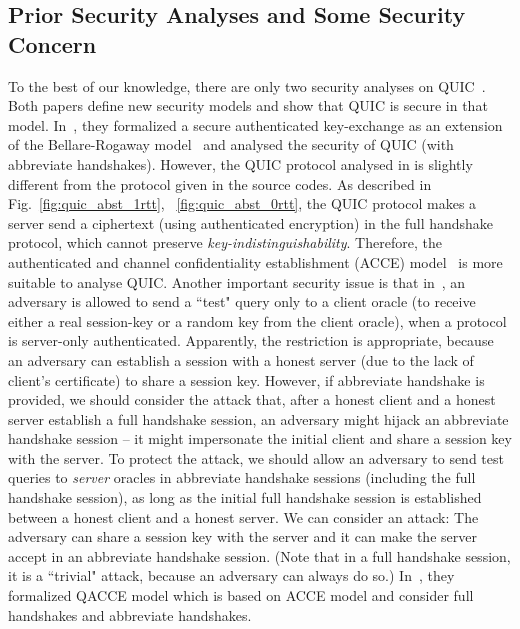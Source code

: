 \subsection{Prior Security Analyses and Some Security Concern} \label{sec:concern}
To the best of our knowledge, there are only two
security analyses on QUIC~\cite{FG14:QUIC,LJBN15:QUIC}.
Both papers define new security models and show that
QUIC is secure in that model.
In~\cite{FG14:QUIC}, they formalized a secure
authenticated key-exchange as an extension of the
Bellare-Rogaway model~\cite{BR93:AKE} and analysed the
security of QUIC (with abbreviate handshakes).
However, the QUIC protocol analysed in \cite{FG14:QUIC}
is slightly different from the protocol given in the
source codes.
As described in Fig.~\ref{fig:quic_abst_1rtt},
~\ref{fig:quic_abst_0rtt}, the QUIC protocol makes a
server send a ciphertext (using authenticated
encryption) in the full handshake protocol, which cannot
preserve \textit{key-indistinguishability}.
Therefore, the authenticated and channel confidentiality
establishment (ACCE) model~\cite{JKSS12:ACCE} is more
suitable to analyse QUIC.
Another important security issue is that in~\cite{FG14:QUIC},
an adversary is allowed to send a ``test" query only to
a client oracle (to receive either a real session-key or
a random key from the client oracle), when a protocol
is server-only authenticated.
Apparently, the restriction is appropriate, because
an adversary can establish a session with a honest
server (due to the lack of client's certificate) to
share a session key.
However, if abbreviate handshake is provided, we should consider
the attack that, after a honest client and a honest
server establish a full handshake session, an adversary
might hijack an abbreviate handshake session -- it might
impersonate the initial client and share a session key
with the server.
To protect the attack, we should allow an adversary to
send test queries to \textit{server} oracles in abbreviate
handshake sessions (including the full handshake session), as long
as the initial full handshake session is established
between a honest client and a honest server.
We can consider an attack: The adversary can
share a session key with the server and it can make the
server accept in an abbreviate handshake session. (Note that in a
full handshake session, it is a ``trivial" attack, because
an adversary can always do so.)
In~\cite{LJBN15:QUIC}, they formalized QACCE model which
is based on ACCE model and consider full handshakes and
abbreviate handshakes.

